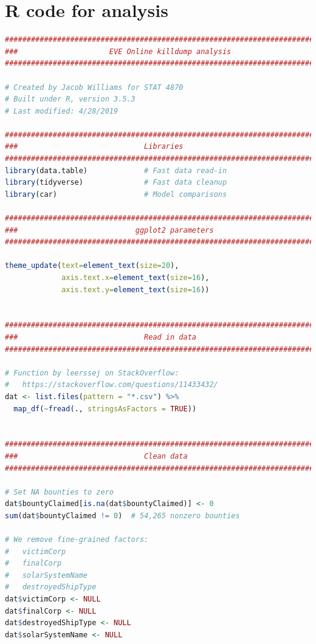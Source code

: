 \documentclass[letterpaper,12pt,article]{memoir}
\begin{document}
\section{R code for analysis}
{\tiny
\begin{lstlisting}[language=R]
###############################################################################
###                     EVE Online killdump analysis                        ###
###############################################################################

# Created by Jacob Williams for STAT 4870
# Built under R, version 3.5.3
# Last modified: 4/28/2019

###############################################################################
###                             Libraries                                   ###
###############################################################################
library(data.table)             # Fast data read-in
library(tidyverse)              # Fast data cleanup
library(car)                    # Model comparisons

###############################################################################
###                           ggplot2 parameters                            ###
###############################################################################

theme_update(text=element_text(size=20),
             axis.text.x=element_text(size=16),
             axis.text.y=element_text(size=16))


###############################################################################
###                             Read in data                                ###
###############################################################################

# Function by leerssej on StackOverflow:
#   https://stackoverflow.com/questions/11433432/
dat <- list.files(pattern = "*.csv") %>% 
  map_df(~fread(., stringsAsFactors = TRUE))


###############################################################################
###                             Clean data                                  ###
###############################################################################

# Set NA bounties to zero
dat$bountyClaimed[is.na(dat$bountyClaimed)] <- 0
sum(dat$bountyClaimed != 0)  # 54,265 nonzero bounties

# We remove fine-grained factors:
#   victimCorp
#   finalCorp
#   solarSystemName
#   destroyedShipType
dat$victimCorp <- NULL
dat$finalCorp <- NULL
dat$destroyedShipType <- NULL
dat$solarSystemName <- NULL


\end{lstlisting}}
\end{document}
